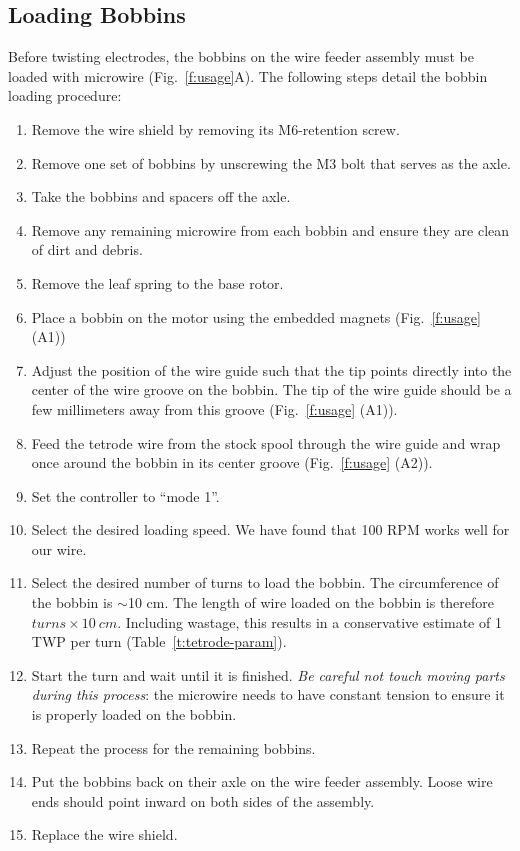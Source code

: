 \documentclass[11pt,a4paper]{article}
\begin{document}
\subsection{Loading Bobbins}
Before twisting electrodes, the bobbins on the wire feeder assembly must be
loaded with microwire (Fig.~\ref{f:usage}A). The following steps detail the
bobbin loading procedure:
\begin{enumerate}[noitemsep]
    \item Remove the wire shield by removing its M6-retention screw.
    \item Remove one set of bobbins by unscrewing the M3 bolt that serves as
        the axle.
    \item Take the bobbins and spacers off the axle.
    \item Remove any remaining microwire from each bobbin and ensure they
        are clean of dirt and debris.
    \item Remove the leaf spring to the base rotor.
    \item Place a bobbin on the motor using the embedded magnets
        (Fig.~\ref{f:usage} (A1))
    \item Adjust the position of the wire guide such that the tip points
        directly into the center of the wire groove on the bobbin. The tip of
        the wire guide should be a few millimeters away from this groove
        (Fig.~\ref{f:usage} (A1)).
    \item Feed the tetrode wire from the stock spool through the wire guide and
        wrap once around the bobbin in its center groove
        (Fig.~\ref{f:usage} (A2)).
    \item Set the controller to ``mode 1''.
    \item Select the desired loading speed. We have found that 100 RPM works
        well for our wire.
    \item Select the desired number of turns to load the bobbin. The
        circumference of the bobbin is $\sim$10 cm. The length of wire loaded
        on the bobbin is therefore $turns \times 10\ cm$. Including wastage,
        this results in a conservative estimate of 1 TWP per turn
        (Table~\ref{t:tetrode-param}).
    \item Start the turn and wait until it is finished. \textit{Be careful not
        touch moving parts during this process}: the microwire needs to have
        constant tension to ensure it is properly loaded on the bobbin.
    \item Repeat the process for the remaining bobbins.
    \item Put the bobbins back on their axle on the wire feeder assembly. Loose
        wire ends should point inward on both sides of the assembly.
    \item Replace the wire shield.
\end{enumerate}
\end{document}

